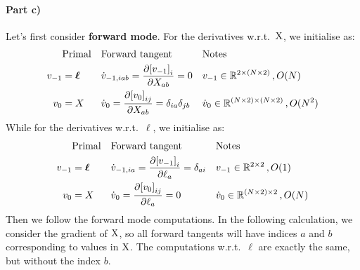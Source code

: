 \paragraph{Part c)} Let's first consider \textbf{forward mode}. For the derivatives w.r.t.~${\mathrm{{X}}}$, we initialise as:
\begin{align}
&\text{Primal} && \text{Forward tangent} && \text{Notes} \nonumber \\
v_{-1} &= \boldsymbol \ell && \dot v_{-1,iab} = \pderiv[{[v_{-1}]}_{i}]{X_{ab}} = 0 && v_{-1} \in \Reals^{2 \times (N\times 2)}\,, O(N) \\ %
v_0 &= X && \dot v_0 = \pderiv[{[v_0]}_{ij}]{X_{ab}} = \delta_{ia}\delta_{jb}  &&  \dot v_0 \in \Reals^{(N\times 2)\times (N\times 2)}\,, O(N^2)
\end{align}
While for the derivatives w.r.t.~$\boldsymbol \ell$, we initialise as:
\begin{align}
&\text{Primal} && \text{Forward tangent} && \text{Notes} \nonumber \\
v_{-1} &= \boldsymbol \ell && \dot v_{-1,ia} = \pderiv[{[v_{-1}]}_{i}]{\ell_{a}} = \delta_{ai} && v_{-1} \in \Reals^{2 \times 2}\,, O(1) \\ %
v_0 &= X && \dot v_0 = \pderiv[{[v_0]}_{ij}]{\ell_{a}} = 0  &&  \dot v_0 \in \Reals^{(N\times 2)\times 2}\,, O(N) \\
\end{align}
Then we follow the forward mode computations. In the following calculation, we consider the gradient of ${\mathrm{{X}}}$, so all forward tangents will have indices $a$ and $b$ corresponding to values in ${\mathrm{{X}}}$. The computations w.r.t.~$\boldsymbol \ell$ are exactly the same, but without the index $b$.
